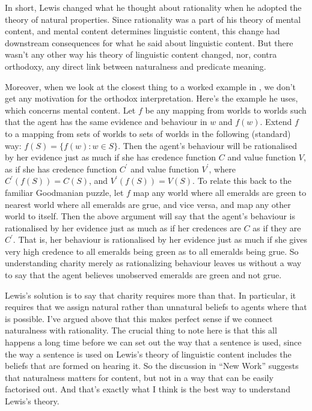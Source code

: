 In short, Lewis changed what he thought about rationality when he adopted the theory of natural properties. Since rationality was a part of his theory of mental content, and mental content determines linguistic content, this change had downstream consequences for what he said about linguistic content. But there wasn't any other way his theory of linguistic content changed, nor, contra orthodoxy, any direct link between naturalness and predicate meaning.

Moreover, when we look at the closest thing to a worked example in \citet{Lewis1983e}, we don't get any motivation for the orthodox interpretation. Here's the example he uses, which concerns mental content. Let $f$ be any mapping from worlds to worlds such that the agent has the same evidence and behaviour in $w$ and $f(w)$. Extend $f$ to a mapping from sets of worlds to sets of worlds in the following (standard) way: $f(S) = \{f(w): w \in S\}$. Then the agent's behaviour will be rationalised by her evidence just as much if she has credence function $C$ and value function $V$, as if she has credence function $C^\prime$ and value function $V^\prime$, where $C^\prime(f(S)) = C(S)$, and $V^\prime(f(S)) = V(S)$. To relate this back to the familiar Goodmanian puzzle, let $f$ map any world where all emeralds are green to nearest world where all emeralds are grue, and vice versa, and map any other world to itself. Then the above argument will say that the agent's behaviour is rationalised by her evidence just as much as if her credences are $C$ as if they are $C^\prime$. That is, her behaviour is rationalised by her evidence just as much if she gives very high credence to all emeralds being green as to all emeralds being grue. So understanding charity merely as rationalizing behaviour leaves us without a way to say that the agent believes unobserved emeralds are green and not grue. 

Lewis's solution is to say that charity requires more than that. In particular, it requires that we assign natural rather than unnatural beliefs to agents where that is possible. I've argued above that this makes perfect sense if we connect naturalness with rationality. The crucial thing to note here is that this all happens a long time before we can set out the way that a sentence is used, since the way a sentence is used on Lewis's theory of linguistic content includes the beliefs that are formed on hearing it. So the discussion in ``New Work'' suggests that naturalness matters for content, but not in a way that can be easily factorised out. And that's exactly what I think is the best way to understand Lewis's theory.

